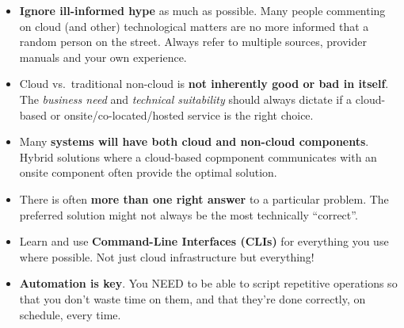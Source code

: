 \begin{itemize}
\item
  \textbf{Ignore ill-informed hype} as much as possible. Many people
  commenting on cloud (and other) technological matters are no more
  informed that a random person on the street. Always refer to multiple
  sources, provider manuals and your own experience.
\item
  Cloud vs.~traditional non-cloud is \textbf{not inherently good or bad
  in itself}. The \emph{business need} and \emph{technical suitability}
  should always dictate if a cloud-based or onsite/co-located/hosted
  service is the right choice.
\item
  Many \textbf{systems will have both cloud and non-cloud components}.
  Hybrid solutions where a cloud-based copmponent communicates with an
  onsite component often provide the optimal solution.
\item
  There is often \textbf{more than one right answer} to a particular
  problem. The preferred solution might not always be the most
  technically ``correct''.
\item
  Learn and use \textbf{Command-Line Interfaces (CLIs)} for everything
  you use where possible. Not just cloud infrastructure but everything!
\item
  \textbf{Automation is key}. You NEED to be able to script repetitive
  operations so that you don't waste time on them, and that they're done
  correctly, on schedule, every time.
\end{itemize}

